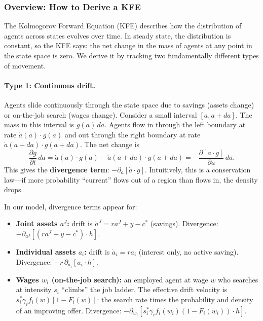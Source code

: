 \documentclass{article}
\begin{document}
\subsubsection*{Overview: How to Derive a KFE}

The Kolmogorov Forward Equation (KFE) describes how the distribution of agents across states evolves over time. In steady state, the distribution is constant, so the KFE says: the net change in the mass of agents at any point in the state space is zero. We derive it by tracking two fundamentally different types of movement.

\paragraph{Type 1: Continuous drift.} Agents slide continuously through the state space due to savings (assets change) or on-the-job search (wages change). Consider a small interval $[a, a+da]$. The mass in this interval is $g(a)\,da$. Agents flow in through the left boundary at rate $\dot{a}(a)\cdot g(a)$ and out through the right boundary at rate $\dot{a}(a+da)\cdot g(a+da)$. The net change is
\[
    \frac{\partial g}{\partial t}\,da = \dot{a}(a)\cdot g(a) - \dot{a}(a+da)\cdot g(a+da) = -\frac{\partial[\dot{a}\cdot g]}{\partial a}\,da.
\]
This gives the \textbf{divergence term}: $-\partial_a[\dot{a}\cdot g]$. Intuitively, this is a conservation law---if more probability ``current'' flows out of a region than flows in, the density drops.

In our model, divergence terms appear for:
\begin{itemize}
    \item \textbf{Joint assets $a^J$:} drift is $\dot{a}^J = ra^J + y - c^*$ (savings). Divergence: $-\partial_{a^J}[(ra^J + y - c^*)\cdot h]$.
    \item \textbf{Individual assets $a_i$:} drift is $\dot{a}_i = ra_i$ (interest only, no active saving). Divergence: $-r\,\partial_{a_i}[a_i\cdot h]$.
    \item \textbf{Wages $w_i$ (on-the-job search):} an employed agent at wage $w$ who searches at intensity $s_i$ ``climbs'' the job ladder. The effective drift velocity is $s_i^*\gamma_i f_i(w)[1-F_i(w)]$: the search rate times the probability and density of an improving offer. Divergence: $-\partial_{w_i}[s_i^*\gamma_i f_i(w_i)(1-F_i(w_i))\cdot h]$.
\end{itemize}
\end{document}
